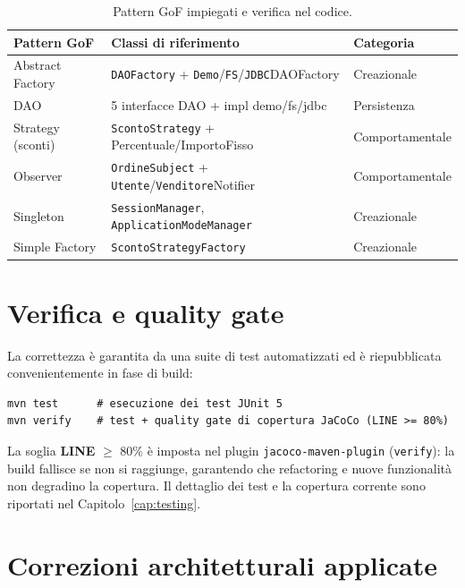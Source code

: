 \begin{table}[H]
    \centering
    \small
    \begin{tabular}{@{}lll@{}}
        \toprule
        \textbf{Pattern GoF} & \textbf{Classi di riferimento} & \textbf{Categoria}\\
        \midrule
        Abstract Factory & \texttt{DAOFactory} + \texttt{Demo}/\texttt{FS}/\texttt{JDBC}DAOFactory & Creazionale\\
        DAO & 5 interfacce DAO + impl demo/fs/jdbc & Persistenza\\
        Strategy (sconti) & \texttt{ScontoStrategy} + Percentuale/ImportoFisso & Comportamentale\\
        Observer & \texttt{OrdineSubject} + \texttt{Utente}/\texttt{Venditore}Notifier & Comportamentale\\
        Singleton & \texttt{SessionManager}, \texttt{ApplicationModeManager} & Creazionale\\
        Simple Factory & \texttt{ScontoStrategyFactory} & Creazionale\\
        \bottomrule
    \end{tabular}
    \caption{Pattern GoF impiegati e verifica nel codice.}
    \label{tab:gof}
\end{table}

\section{Verifica e quality gate}
\label{sec:qualita_verifica}

La correttezza è garantita da una suite di test automatizzati ed è riepubblicata
convenientemente in fase di build:

\begin{verbatim}
mvn test      # esecuzione dei test JUnit 5
mvn verify    # test + quality gate di copertura JaCoCo (LINE >= 80%)
\end{verbatim}

La soglia \textbf{LINE} $\geq$ 80\% è imposta nel plugin \texttt{jacoco-maven-plugin}
(\texttt{verify}): la build fallisce se non si raggiunge, garantendo che
refactoring e nuove funzionalità non degradino la copertura. Il dettaglio dei
test e la copertura corrente sono riportati nel Capitolo~\ref{cap:testing}.

\section{Correzioni architetturali applicate}
\label{sec:qualita_correzioni}

